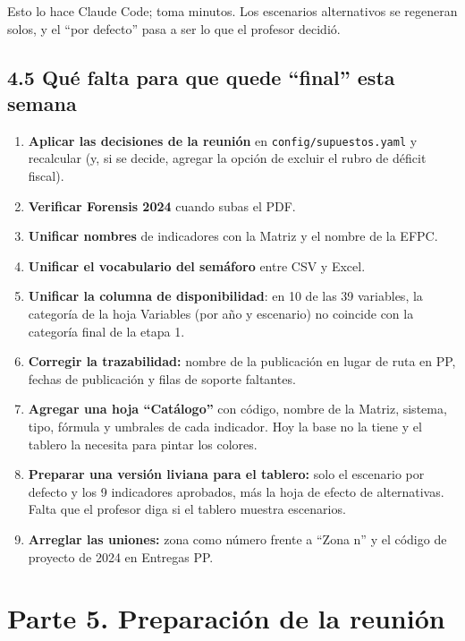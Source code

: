 \documentclass[11pt,letterpaper]{article}
\begin{document}
Esto lo hace Claude Code; toma minutos. Los escenarios alternativos se regeneran solos, y el ``por defecto'' pasa a ser lo que el profesor decidió.

\subsection*{4.5 Qué falta para que quede ``final'' esta semana}


\begin{enumerate}
\item \textbf{Aplicar las decisiones de la reunión} en \texttt{\footnotesize config/\allowbreak{}supuestos.\allowbreak{}yaml} y recalcular (y, si se decide, agregar la opción de excluir el rubro de déficit fiscal).
\item \textbf{Verificar Forensis 2024} cuando subas el PDF.
\item \textbf{Unificar nombres} de indicadores con la Matriz y el nombre de la EFPC.
\item \textbf{Unificar el vocabulario del semáforo} entre CSV y Excel.
\item \textbf{Unificar la columna de disponibilidad}: en 10 de las 39 variables, la categoría de la hoja Variables (por año y escenario) no coincide con la categoría final de la etapa 1.
\item \textbf{Corregir la trazabilidad:} nombre de la publicación en lugar de ruta en PP, fechas de publicación y filas de soporte faltantes.
\item \textbf{Agregar una hoja ``Catálogo''} con código, nombre de la Matriz, sistema, tipo, fórmula y umbrales de cada indicador. Hoy la base no la tiene y el tablero la necesita para pintar los colores.
\item \textbf{Preparar una versión liviana para el tablero:} solo el escenario por defecto y los 9 indicadores aprobados, más la hoja de efecto de alternativas. Falta que el profesor diga si el tablero muestra escenarios.
\item \textbf{Arreglar las uniones:} zona como número frente a ``Zona n'' y el código de proyecto de 2024 en Entregas PP.
\end{enumerate}

\clearpage

\section*{Parte 5. Preparación de la reunión}
\end{document}

